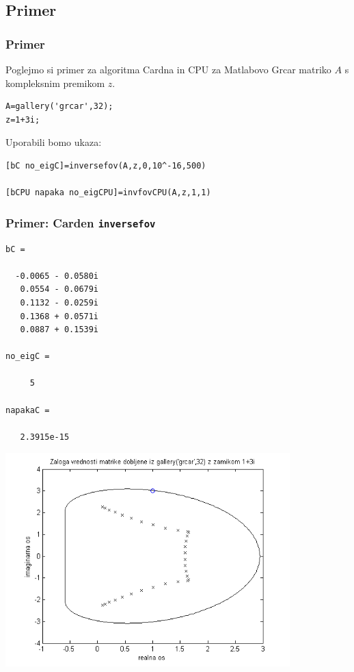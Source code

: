 \documentclass{beamer}
\begin{document}
\subsection{Primer}
\begin{frame}[fragile]
\frametitle{Primer}
Poglejmo si primer za algoritma Cardna in CPU za Matlabovo Grcar matriko $A$ s kompleksnim premikom $z$.
\begin{verbatim}
A=gallery('grcar',32);
z=1+3i;
\end{verbatim}
Uporabili bomo ukaza:
\begin{verbatim}
[bC no_eigC]=inversefov(A,z,0,10^-16,500)

[bCPU napaka no_eigCPU]=invfovCPU(A,z,1,1)
\end{verbatim}
\end{frame}
\begin{frame}[fragile]
\frametitle{Primer: Carden \texttt{inversefov}}

\begin{verbatim}
bC =

  -0.0065 - 0.0580i
   0.0554 - 0.0679i
   0.1132 - 0.0259i
   0.1368 + 0.0571i
   0.0887 + 0.1539i

no_eigC =

     5   

napakaC =

   2.3915e-15
\end{verbatim}
\end{frame}
\begin{frame}
\begin{center}
\includegraphics[width=11cm]{carden1.png}
\end{center}
\end{frame}
\end{document}
